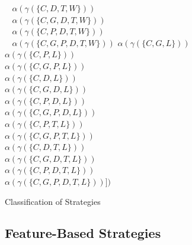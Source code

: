 \begin{frame}{\myframetitle}
\begin{fancycolumns}
\begin{example}{}
\begin{fancycolumns}[animation=none]
				$~~~~\alpha(\gamma(\{C,D,T,W\}))$\\
				$~~~~\alpha(\gamma(\{C,G,D,T,W\}))$\\
				$~~~~\alpha(\gamma(\{C,P,D,T,W\}))$\\
				$~~~~\alpha(\gamma(\{C,G,P,D,T,W\}))$
			\nextcolumn
				$\alpha(\gamma(\{C,G,L\}))$\\
				$\alpha(\gamma(\{C,P,L\}))$\\
				$\alpha(\gamma(\{C,G,P,L\}))$\\
				$\alpha(\gamma(\{C,D,L\}))$\\
				$\alpha(\gamma(\{C,G,D,L\}))$\\
				$\alpha(\gamma(\{C,P,D,L\}))$\\
				$\alpha(\gamma(\{C,G,P,D,L\}))$\\
				$\alpha(\gamma(\{C,P,T,L\}))$\\
				$\alpha(\gamma(\{C,G,P,T,L\}))$\\
				$\alpha(\gamma(\{C,D,T,L\}))$\\
				$\alpha(\gamma(\{C,G,D,T,L\}))$\\
				$\alpha(\gamma(\{C,P,D,T,L\}))$\\
				$\alpha(\gamma(\{C,G,P,D,T,L\}))])$
			\end{fancycolumns}
		\end{example}
	\end{fancycolumns}
\end{frame}

\begin{frame}{Classification of Strategies}
	\begin{fancycolumns}[t,columns=3,animation=none]
		\summaryproductbased
	\nextcolumn
	\nextcolumn
	\end{fancycolumns}
\end{frame}

\subsection{Feature-Based Strategies}


